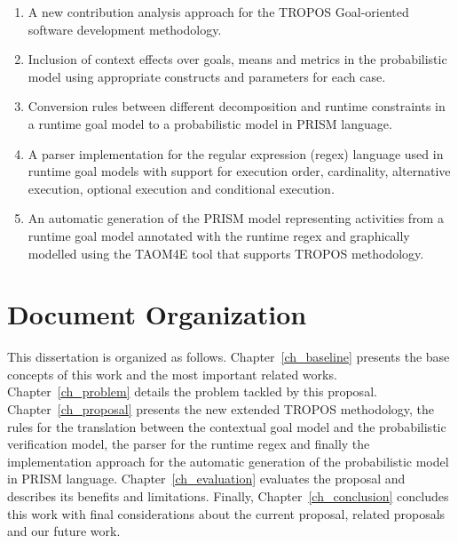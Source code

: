 \begin{enumerate}

\item A new contribution analysis approach for the TROPOS Goal-oriented software development methodology.

\item Inclusion of context effects over goals, means and metrics in the probabilistic model using appropriate constructs and parameters for each case.

\item Conversion rules between different decomposition and runtime constraints in a runtime goal model to a probabilistic model in PRISM language.

\item A parser implementation for the regular expression (regex) language used in runtime goal models with support for execution order, cardinality, alternative execution, optional execution and conditional execution. 

\item An automatic generation of the PRISM model representing activities from a runtime goal model annotated with the runtime regex and graphically modelled using the TAOM4E tool that supports TROPOS methodology.

\end{enumerate}

\section{Document Organization}

This dissertation is organized as follows. Chapter~\ref{ch_baseline} presents the base concepts of this work and the most important related works. Chapter~\ref{ch_problem} details the problem tackled by this proposal. Chapter~\ref{ch_proposal} presents the new extended TROPOS methodology, the rules for the translation between the contextual goal model and the probabilistic verification model, the parser for the runtime regex and finally the implementation approach for the automatic generation of the probabilistic model in PRISM language. Chapter~\ref{ch_evaluation} evaluates the proposal and describes its benefits and limitations. Finally, Chapter~\ref{ch_conclusion} concludes this work with final considerations about the current proposal, related proposals and our future work.